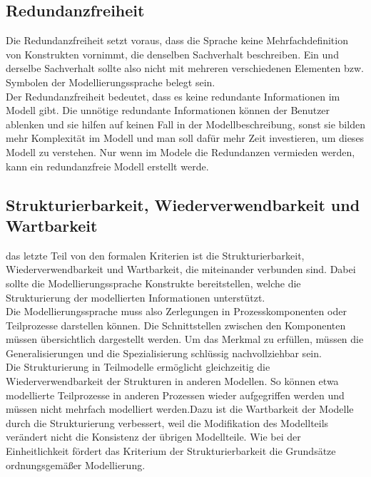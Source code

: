 \subsection{Redundanzfreiheit}
Die Redundanzfreiheit setzt voraus, dass die Sprache keine Mehrfachdefinition von Konstrukten vornimmt, die denselben Sachverhalt beschreiben. Ein und derselbe Sachverhalt sollte also nicht mit mehreren verschiedenen Elementen bzw. Symbolen der Modellierungssprache belegt sein.\cite{MT007}\\
Der Redundanzfreiheit bedeutet, dass es keine redundante Informationen im Modell gibt. Die unnötige redundante Informationen können der Benutzer ablenken und sie hilfen auf keinen Fall in der Modellbeschreibung, sonst sie bilden mehr Komplexität im Modell und man soll dafür mehr Zeit investieren, um dieses Modell zu verstehen.
Nur wenn im Modele die Redundanzen vermieden werden, kann ein
redundanzfreie Modell erstellt werde.
\subsection{Strukturierbarkeit, Wiederverwendbarkeit und Wartbarkeit}
das letzte Teil von den formalen Kriterien ist die Strukturierbarkeit, Wiederverwendbarkeit und Wartbarkeit, die miteinander verbunden sind. Dabei sollte die Modellierungssprache Konstrukte bereitstellen, welche die Strukturierung der modellierten Informationen unterstützt.\\
Die Modellierungssprache muss also Zerlegungen in Prozesskomponenten oder Teilprozesse darstellen können. Die Schnittstellen zwischen den Komponenten müssen übersichtlich dargestellt werden.\cite{MT002}
Um das Merkmal zu erfüllen, müssen die Generalisierungen und die Spezialisierung schlüssig nachvollziehbar sein.\\
Die Strukturierung in Teilmodelle ermöglicht gleichzeitig die Wiederverwendbarkeit der Strukturen in anderen Modellen. So können etwa modellierte Teilprozesse in anderen Prozessen wieder aufgegriffen werden und müssen nicht mehrfach modelliert werden.\cite{MT007}Dazu ist die Wartbarkeit der Modelle durch die Strukturierung verbessert, weil die Modifikation des Modellteils verändert nicht die Konsistenz der übrigen Modellteile.
Wie bei der Einheitlichkeit fördert das Kriterium der Strukturierbarkeit die Grundsätze ordnungsgemäßer Modellierung.
